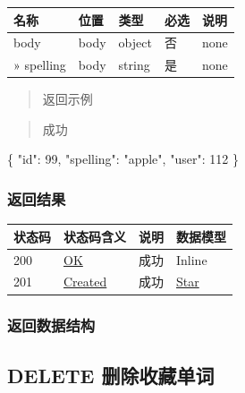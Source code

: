 \documentclass[
]{article}
\newenvironment{Shaded}{}{}
\newcommand{\DataTypeTok}[1]{\textcolor[rgb]{0.56,0.13,0.00}{#1}}
\newcommand{\DecValTok}[1]{\textcolor[rgb]{0.25,0.63,0.44}{#1}}
\newcommand{\FunctionTok}[1]{\textcolor[rgb]{0.02,0.16,0.49}{#1}}
\newcommand{\StringTok}[1]{\textcolor[rgb]{0.25,0.44,0.63}{#1}}
\begin{document}
\begin{longtable}[]{@{}lllll@{}}
\toprule
名称 & 位置 & 类型 & 必选 & 说明 \\
\midrule
\endhead
body & body & object & 否 & none \\
» spelling & body & string & 是 & none \\
\bottomrule
\end{longtable}

\begin{quote}
返回示例
\end{quote}

\begin{quote}
成功
\end{quote}

\begin{Shaded}
\begin{Highlighting}[]
\FunctionTok{\{}
  \DataTypeTok{"id"}\FunctionTok{:} \DecValTok{99}\FunctionTok{,}
  \DataTypeTok{"spelling"}\FunctionTok{:} \StringTok{"apple"}\FunctionTok{,}
  \DataTypeTok{"user"}\FunctionTok{:} \DecValTok{112}
\FunctionTok{\}}
\end{Highlighting}
\end{Shaded}

\hypertarget{ux8fd4ux56deux7ed3ux679c-29}{%
\subsubsection{返回结果}\label{ux8fd4ux56deux7ed3ux679c-29}}

\begin{longtable}[]{@{}llll@{}}
\toprule
状态码 & 状态码含义 & 说明 & 数据模型 \\
\midrule
\endhead
200 & \href{https://tools.ietf.org/html/rfc7231\#section-6.3.1}{OK} &
成功 & Inline \\
201 & \href{https://tools.ietf.org/html/rfc7231\#section-6.3.2}{Created}
& 成功 & \protect\hyperlink{schemastar}{Star} \\
\bottomrule
\end{longtable}

\hypertarget{ux8fd4ux56deux6570ux636eux7ed3ux6784-23}{%
\subsubsection{返回数据结构}\label{ux8fd4ux56deux6570ux636eux7ed3ux6784-23}}

\hypertarget{delete-ux5220ux9664ux6536ux85cfux5355ux8bcd-1}{%
\subsection{DELETE
删除收藏单词}\label{delete-ux5220ux9664ux6536ux85cfux5355ux8bcd-1}}
\end{document}
